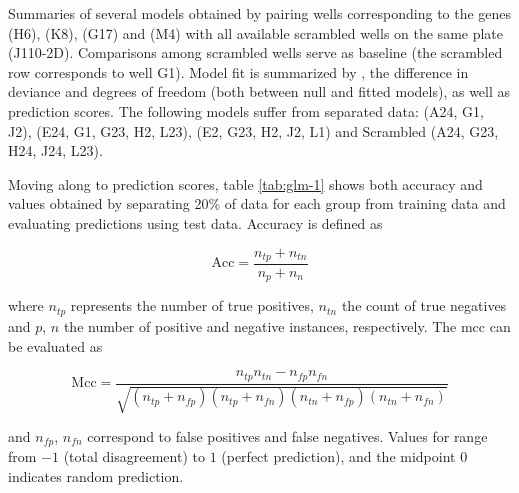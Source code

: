 \renewcommand{\arraystretch}{1.5}
\setlength{\tabcolsep}{0.25em}
\begin{table}
  \centering
  \caption[ model summaries based on principal components for several well pairings.]{Summaries of several  models obtained by pairing wells corresponding to the genes  (H6),  (K8),  (G17) and  (M4) with all available scrambled wells on the same plate (J110-2D). Comparisons among scrambled wells serve as baseline (the scrambled row corresponds to well G1). Model fit is summarized by , the difference in deviance and degrees of freedom (both between null and fitted models), as well as prediction scores. The following models suffer from separated data:  (A24, G1, J2),  (E24, G1, G23, H2, L23),  (E2, G23, H2, J2, L1) and Scrambled (A24, G23, H24, J24, L23).}
  \label{tab:glm-1}
  \footnotesize
  \vspace{5px}
  
\end{table}

Moving along to prediction scores, table \ref{tab:glm-1} shows both accuracy and  values obtained by separating 20\% of data for each group from training data and evaluating predictions using test data. Accuracy is defined as

\begin{equation}
  \text{Acc} = \frac{n_{tp} + n_{tn}}{n_p+n_n}
\end{equation}

where $n_{tp}$ represents the number of true positives, $n_{tn}$ the count of true negatives and $p$, $n$ the number of positive and negative instances, respectively. The \acrshort{mcc} \citep{Matthews1975} can be evaluated as

\begin{equation}
  \text{Mcc} = \frac{n_{tp} n_{tn} - n_{fp} n_{fn}}{\sqrt{(n_{tp} + n_{fp})(n_{tp} + n_{fn})(n_{tn} + n_{fp})(n_{tn} + n_{fn})}}
\end{equation}

and $n_{fp}$, $n_{fn}$ correspond to false positives and false negatives. Values for  range from $-1$ (total disagreement) to $1$ (perfect prediction), and the midpoint $0$ indicates random prediction.

